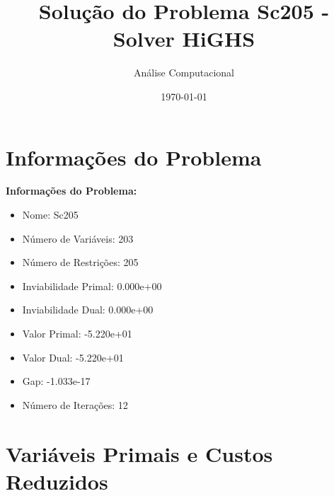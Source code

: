 \documentclass[12pt]{article}
\title{Solução do Problema Sc205 - Solver HiGHS}
\author{Análise Computacional}
\date{\today}
\begin{document}
\maketitle

\section{Informações do Problema}

\textbf{Informações do Problema:}
\begin{itemize}
\item Nome: Sc205
\item Número de Variáveis: 203
\item Número de Restrições: 205
\item Inviabilidade Primal: 0.000e+00
\item Inviabilidade Dual: 0.000e+00
\item Valor Primal: -5.220e+01
\item Valor Dual: -5.220e+01
\item Gap: -1.033e-17
\item Número de Iterações: 12
\end{itemize}


\section{Variáveis Primais e Custos Reduzidos}
\end{document}
